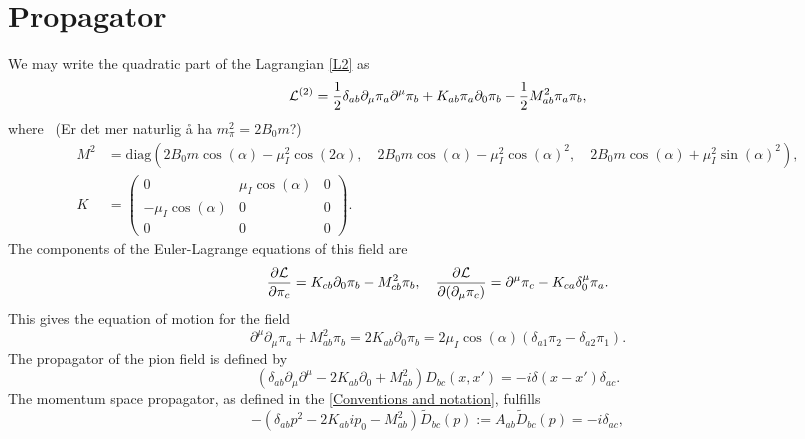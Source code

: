 \documentclass{article}
\begin{document}
\section{Propagator}

We may write the quadratic part of the Lagrangian \autoref{L2} as 
\begin{align}
    \mathcal{L}^{(2)}
    =
    \frac{1}{2} \delta_{ab} \partial_\mu \pi_a \partial^\mu \pi_b
    + K_{ab} \pi_a \partial_0 \pi_b
    - \frac{1}{2} M^2_{ab} \pi_a \pi_b,
\end{align}
where  (Er det mer naturlig å ha $m_\pi^2 = 2 B_0 m$?)
\begin{align*}
    M^2 & = \mathrm{diag} 
    \left(
        2 B_0 m \cos(\alpha) - \mu_I^2 \cos(2\alpha),\quad 
        2 B_0 m \cos(\alpha) - \mu_I^2 \cos(\alpha)^2,\quad
        2 B_0 m \cos(\alpha) + \mu_I^2 \sin(\alpha)^2
    \right),
    \\
    K & =
    \begin{pmatrix}
        0 & \mu_I\cos(\alpha) & 0 \\
        -\mu_I\cos(\alpha) & 0 & 0 \\
        0 & 0 & 0
    \end{pmatrix}.
\end{align*}
The components of the Euler-Lagrange equations of this field are
\begin{equation*}
    \pdv{\mathcal{L}}{\pi_c} = K_{cb} \partial_0 \pi_b - M^2_{cb} \pi_b, \quad
    \pdv{\mathcal{L}}{(\partial_\mu \pi_c)} = \partial^\mu \pi_c - K_{ca}\delta^\mu_0 \pi_a.
\end{equation*}
This gives the equation of motion for the field
\begin{equation}
    \partial^\mu \partial_\mu \pi_a + M^2_{a b} \pi_b 
    = 2 K_{ab}\partial_0 \pi_b 
    = 2 \mu_I \cos(\alpha) (\delta_{a1}\pi_2 - \delta_{a2}\pi_1).
\end{equation}
The propagator of the pion field is defined by
\begin{equation}
    \left(
        \delta_{ab}\partial_\mu\partial^\mu - 2 K_{ab} \partial_0 + M^2_{ab} 
    \right) D_{bc}(x, x') 
    = -i \delta(x - x') \delta_{ac}.
\end{equation}
The momentum space propagator, as defined in the \autoref{Conventions and notation}, fulfills
\begin{equation*}
    -(\delta_{ab}p^2 - 2 K_{ab} i p_0 - M_{ab}^2) \tilde D_{bc}(p) 
    := A_{ab} \tilde D_{bc}(p) = -i \delta_{ac},
\end{equation*}
\end{document}
